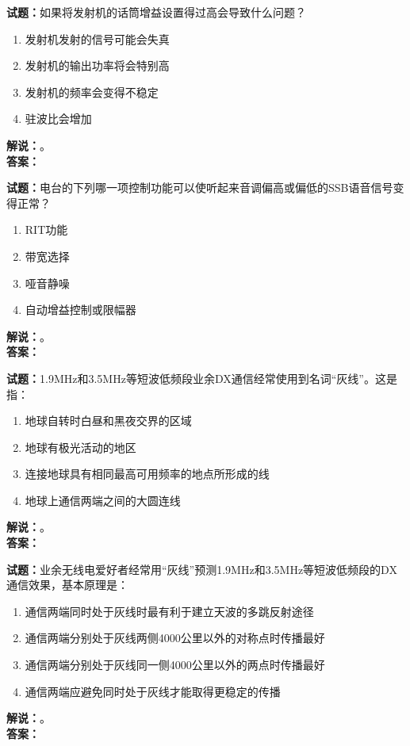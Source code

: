 \documentclass{ctexbook}
\begin{document}
\bigskip




\noindent\textbf{试题：}如果将发射机的话筒增益设置得过高会导致什么问题？
\begin{enumerate}[leftmargin=3em]
\item 发射机发射的信号可能会失真
\item 发射机的输出功率将会特别高
\item 发射机的频率会变得不稳定
\item 驻波比会增加
\end{enumerate}
\noindent\textbf{解说：}\textbf{}。\\\noindent\textbf{答案：}

\bigskip




\noindent\textbf{试题：}电台的下列哪一项控制功能可以使听起来音调偏高或偏低的SSB语音信号变得正常？
\begin{enumerate}[leftmargin=3em]
\item RIT功能
\item 带宽选择
\item 哑音静噪
\item 自动增益控制或限幅器
\end{enumerate}
\noindent\textbf{解说：}\textbf{}。\\\noindent\textbf{答案：}

\bigskip




\noindent\textbf{试题：}1.9\unit{\MHz}和3.5\unit{\MHz}等短波低频段业余DX通信经常使用到名词“灰线”。这是指：
\begin{enumerate}[leftmargin=3em]
\item 地球自转时白昼和黑夜交界的区域
\item 地球有极光活动的地区
\item 连接地球具有相同最高可用频率的地点所形成的线
\item 地球上通信两端之间的大圆连线
\end{enumerate}
\noindent\textbf{解说：}\textbf{}。\\\noindent\textbf{答案：}

\bigskip




\noindent\textbf{试题：}业余无线电爱好者经常用“灰线”预测1.9\unit{\MHz}和3.5\unit{\MHz}等短波低频段的DX通信效果，基本原理是：
\begin{enumerate}[leftmargin=3em]
\item 通信两端同时处于灰线时最有利于建立天波的多跳反射途径
\item 通信两端分别处于灰线两侧4000公里以外的对称点时传播最好
\item 通信两端分别处于灰线同一侧4000公里以外的两点时传播最好
\item 通信两端应避免同时处于灰线才能取得更稳定的传播
\end{enumerate}
\noindent\textbf{解说：}\textbf{}。\\\noindent\textbf{答案：}
\end{document}

